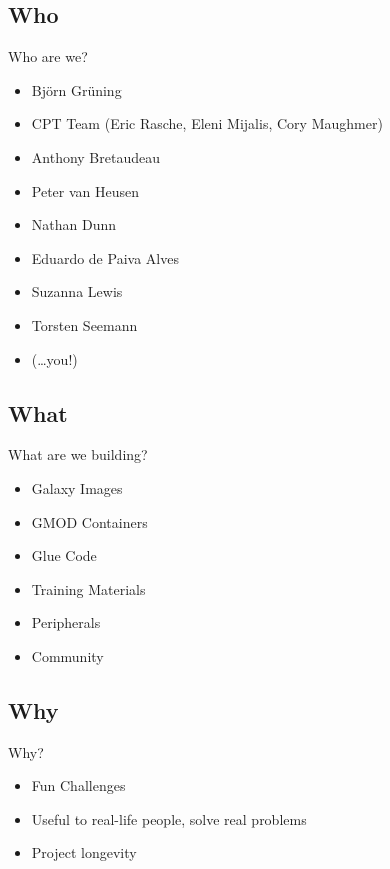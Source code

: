 \documentclass[12pt]{phage3slides} %
\begin{document}
\subsection{Who}
\begin{frame}{Who are we?}
    \begin{itemize}
        \item Bj\"orn Gr\"uning
        \item CPT Team (Eric Rasche, Eleni Mijalis, Cory Maughmer)
        \item Anthony Bretaudeau
        \item Peter van Heusen
        \item Nathan Dunn
        \item Eduardo de Paiva Alves
        \item Suzanna Lewis
        \item Torsten Seemann
        \item (\ldots you!)
    \end{itemize}
\end{frame}

\subsection{What}
\begin{frame}{What are we building?}
    \begin{itemize}
        \item Galaxy Images
        \item GMOD Containers
        \item Glue Code
        \item Training Materials
        \item Peripherals
        \item Community
    \end{itemize}
\end{frame}

\subsection{Why}
\begin{frame}{Why?}
    \begin{itemize}
        \item Fun Challenges
        \item Useful to real-life people, solve real problems
        \item Project longevity
    \end{itemize}
\end{frame}
\end{document}
